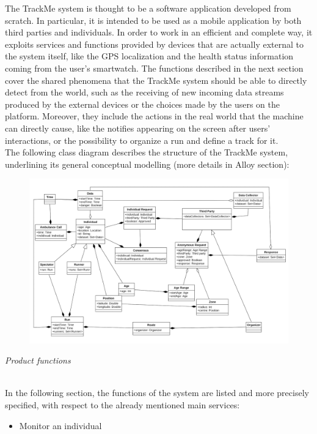 \documentclass{article}
\begin{document}
\begin{legal}
\begin{legal}
{The TrackMe system is thought to be a software application developed from scratch. In particular, it is intended to be used as a mobile application by both third parties and individuals.
In order to work in an efficient and complete way, it exploits services and functions provided by devices that are actually external to the system itself, like the GPS 				localization and the health status information coming from the user’s smartwatch.
The functions described in the next section cover the shared phenomena that the TrackMe system should be able to directly detect from the world, such as the receiving of new incoming data streams produced by the external devices or the choices made by the users on the platform. Moreover, they include the actions in the real world that the machine can directly cause, like the notifies appearing on the screen after users' interactions, or the possibility to organize a run and define a track for it. \\
The following class diagram describes the structure of the TrackMe system, underlining its general conceptual modelling (more details in Alloy section): \\
			}
			\begin{figure}[H]
  			\includegraphics[width=\linewidth]{../images/UML1-0.png}
			\end{figure}
		\item \textit{Product functions} \\\\
		{\normalfont
In the following section, the functions of the system are listed and more precisely specified, with
respect to the already mentioned main services:
		\begin{itemize}
		\item Monitor an individual\\\\

\end{itemize}}
\end{legal}
\end{legal}
\end{document}
